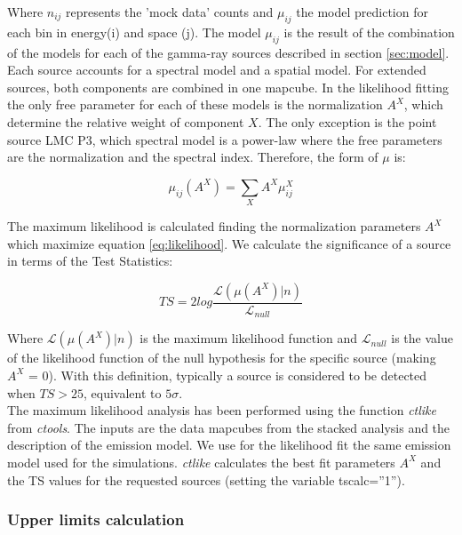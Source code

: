 \documentclass[main.tex]{subfiles}
\begin{document}
Where $n_{ij}$ represents the 'mock data' counts and $\mu_{ij}$ the model prediction for each bin in energy(i) and space (j). The model $\mu_{ij}$ is the result of the combination of the models for each of the gamma-ray sources described in section \ref{sec:model}. Each source accounts for a spectral model and a spatial model. For extended sources, both components are combined in one mapcube. In the likelihood fitting the only free parameter for each of these models is the normalization $A^{X}$, which determine the relative weight of component $X$. The only exception is the point source LMC P3, which spectral model is a power-law where the free parameters are the normalization and the spectral index. Therefore, the form of $\mu$ is:

\begin{equation}
  \mu_{ij}(A^{X}) = \sum_{X} A^{X} \mu^{X}_{ij}
\end{equation}

The maximum likelihood is calculated finding the normalization parameters $A^{X}$ which maximize equation \ref{eq:likelihood}.
We calculate the significance of a source in terms of the Test Statistics:

\begin{equation}
  TS = 2log \frac{\mathcal{L}(\mu(A^{X})|n)}{\mathcal{L}_{null}}
  \label{eq:ts}
\end{equation}

Where $\mathcal{L}(\mu(A^{X})|n)$ is the maximum likelihood function and $\mathcal{L}_{null}$ is the value of the likelihood function of the null hypothesis for the specific source (making $A^X$ = 0). With this definition, typically a source is considered to be detected when $TS>25$, equivalent to $5\sigma$.\\
The maximum likelihood analysis has been performed using the function \textit{ctlike} from \textit{ctools}. The inputs are the data mapcubes from the stacked analysis and the description of the emission model. We use for the likelihood fit the same emission model used for the simulations. \textit{ctlike} calculates the best fit parameters $A^X$ and the TS values for the requested sources (setting the variable tscalc=''1'').

\subsubsection{Upper limits calculation} \label{sec:ulimits}
\end{document}
